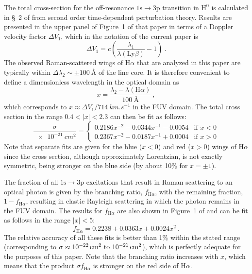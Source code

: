 \documentclass[useAMS, usenatbib, a4paper]{mnras}
\newcommand*\chem[1]{\ensuremath{\mathrm{#1}}}
\newcommand\Config[1]{\ensuremath{\mathrm{#1}}}
\newcommand\ha{\ensuremath{\text{H}\alpha}}
\newcommand\lyb{\ensuremath{\text{Ly}\beta}}
\begin{document}
The total cross-section for the off-resonance \Config{1s \to 3p}
transition in \chem{H^0} is calculated in \S~2 of \citet{Chang:2015a}
from second order time-dependent perturbation theory. Results are
presented in the upper panel of Figure~1 of that paper in terms of a
Doppler velocity factor \(\Delta V_1\), which in the notation of the
current paper is
\begin{equation}
  \label{eq:chang-DeltaV1}
  \Delta V_1 = c \left( \frac{\lambda_1}{\lambda(\lyb)} - 1 \right) \ .
\end{equation}
The observed Raman-scattered wings of \ha{} that are analyzed in this paper
are typically within \(\Delta\lambda_2 \sim \pm \SI{100}{\angstrom}\) of the line
core.  It is therefore convenient to define a dimensionless wavelength
in the optical domain as
\begin{equation}
  \label{eq:x-optical-def}
  x = \frac{\lambda_2 - \lambda(\ha)}{\SI{100}{\angstrom}} \ ,
\end{equation}
which corresponds to \(x \approx \Delta V_1 / \SI{714}{km.s^{-1}}\) in the FUV
domain.  The total cross section in the range \(0.4 < |x| < 2.3\) can
then be fit as follows:
\begin{equation}
  \label{eq:total-cross-section-fit}
  \frac{\sigma}{\SI{e-21}{cm^2}} =  
  \begin{cases}
    0.2186 x^{-2} - 0.0344 x^{-1} - 0.0054 & \text{if \(x < 0\)} \\
    0.2367 x^{-2} - 0.0187 x^{-1} + 0.0004 & \text{if \(x > 0\)} 
  \end{cases}
\end{equation}
Note that separate fits are given for the blue (\(x < 0\)) and red
(\(x > 0\)) wings of \ha{} since the cross section, although
approximately Lorentzian, is not exactly symmetric, being stronger on
the blue side (by about 10\% for \(x = \pm 1\)).

The fraction of all \Config{1s \to 3p} excitations that result in Raman
scattering to an optical photon is given by the branching ratio,
\(f_{\ha}\), with the remaining fraction, \(1 - f_{\ha}\), resulting
in elastic Rayleigh scattering in which the photon remains in the FUV
domain.  The results for \(f_{\ha}\) are also shown in Figure~1 of
\citet{Chang:2015a} and can be fit as follows in the range
\(|x| < 5\):
\begin{equation}
  \label{eq:fha-fit}
  f_{\ha} = 0.2238 + 0.0363 x + 0.0024 x^2 \ .
\end{equation}
The relative accuracy of all these fits is better than 1\% within the
stated range (corresponding to
\(\sigma \approx \text{\SIrange{e-22}{e-21}{cm^2}}\)), which is perfectly
adequate for the purposes of this paper.  Note that the branching
ratio increases with \(x\), which means that the product
\(\sigma f_{\ha} \) is stronger on the red side of \ha{}.





\bsp	%
\label{lastpage}
\end{document}
